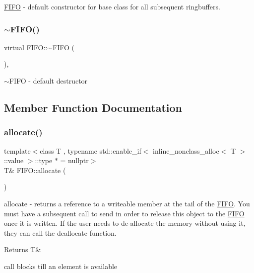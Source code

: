 \hyperlink{class_f_i_f_o}{F\+I\+FO} -\/ default constructor for base class for all subsequent ringbuffers. \hypertarget{class_f_i_f_o_a75da1c02fbe46eb47f948f37d063dabf}{}\label{class_f_i_f_o_a75da1c02fbe46eb47f948f37d063dabf} 
\subsubsection{\texorpdfstring{$\sim$\+F\+I\+F\+O()}{~FIFO()}}
{\footnotesize\ttfamily virtual F\+I\+F\+O\+::$\sim$\+F\+I\+FO (\begin{DoxyParamCaption}{ }\end{DoxyParamCaption})\hspace{0.3cm}{\ttfamily [virtual]}, {\ttfamily [default]}}

$\sim$\+F\+I\+FO -\/ default destructor 

\subsection{Member Function Documentation}
\hypertarget{class_f_i_f_o_a43ad12d67e3611fafae4d6ed862c60b9}{}\label{class_f_i_f_o_a43ad12d67e3611fafae4d6ed862c60b9} 
\subsubsection{\texorpdfstring{allocate()}{allocate()}\hspace{0.1cm}{\footnotesize\ttfamily [1/3]}}
{\footnotesize\ttfamily template$<$class T , typename std\+::enable\+\_\+if$<$ inline\+\_\+nonclass\+\_\+alloc$<$ T $>$\+::value $>$\+::type $\ast$  = nullptr$>$ \\
T\& F\+I\+F\+O\+::allocate (\begin{DoxyParamCaption}{ }\end{DoxyParamCaption})\hspace{0.3cm}{\ttfamily [inline]}}

allocate -\/ returns a reference to a writeable member at the tail of the \hyperlink{class_f_i_f_o}{F\+I\+FO}. You must have a subsequent call to send in order to release this object to the \hyperlink{class_f_i_f_o}{F\+I\+FO} once it is written. If the user needs to de-\/allocate the memory without using it, they can call the deallocate function. \begin{DoxyReturn}{Returns}
T\& 
\end{DoxyReturn}
call blocks till an element is available 

